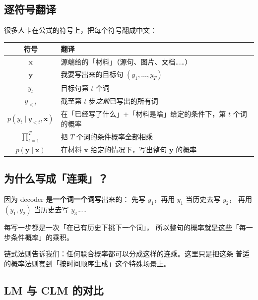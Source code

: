 \documentclass[11pt,a4paper]{ctexart}
\newcommand{\vect}[1]{\boldsymbol{#1}}
\begin{document}
\subsection{逐符号翻译}

很多人卡在公式的符号上，把每个符号翻成中文：

\begin{center}
\renewcommand{\arraystretch}{1.25}
\begin{tabular}{@{}c l@{}}
\toprule
符号 & 翻译 \\
\midrule
$\vect{x}$        & 源端给的「材料」（源句、图片、文档……） \\
$\vect{y}$        & 我要写出来的目标句  $(y_1, \dots, y_T)$ \\
$y_t$             & 目标句第 $t$ 个词 \\
$y_{<t}$          & 截至第 $t$ 步\emph{之前}已写出的所有词 \\
$p(y_t \mid y_{<t}, \vect{x})$ & 在「已经写了什么」+「材料是啥」给定的条件下，第 $t$ 个词的概率 \\
$\prod_{t=1}^{T}$ & 把 $T$ 个词的条件概率全部相乘 \\
$p(\vect{y} \mid \vect{x})$ & 在材料 $\vect{x}$ 给定的情况下，写出整句 $\vect{y}$ 的概率 \\
\bottomrule
\end{tabular}
\end{center}

\subsection{为什么写成「连乘」？}

\begin{intuitionblock}
因为 decoder 是\textbf{一个词一个词写}出来的：
先写 $y_1$，再用 $y_1$ 当历史去写 $y_2$，
再用 $(y_1, y_2)$ 当历史去写 $y_3$……

每写一步都是一次「在已有历史下挑下一个词」，
所以整句的概率就是这些「每一步条件概率」的乘积。
\end{intuitionblock}

链式法则告诉我们：任何联合概率都可以分成这样的连乘。这里只是把这条
普适的概率法则套到「按时间顺序生成」这个特殊场景上。

\subsection{LM 与 CLM 的对比}
\end{document}
